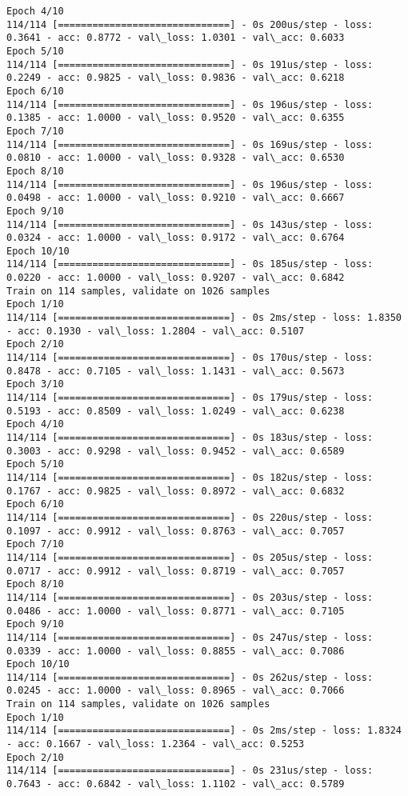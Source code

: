 \documentclass[11pt]{article}
\begin{document}
\begin{Verbatim}[commandchars=\\\{\}]
Epoch 4/10
114/114 [==============================] - 0s 200us/step - loss: 0.3641 - acc: 0.8772 - val\_loss: 1.0301 - val\_acc: 0.6033
Epoch 5/10
114/114 [==============================] - 0s 191us/step - loss: 0.2249 - acc: 0.9825 - val\_loss: 0.9836 - val\_acc: 0.6218
Epoch 6/10
114/114 [==============================] - 0s 196us/step - loss: 0.1385 - acc: 1.0000 - val\_loss: 0.9520 - val\_acc: 0.6355
Epoch 7/10
114/114 [==============================] - 0s 169us/step - loss: 0.0810 - acc: 1.0000 - val\_loss: 0.9328 - val\_acc: 0.6530
Epoch 8/10
114/114 [==============================] - 0s 196us/step - loss: 0.0498 - acc: 1.0000 - val\_loss: 0.9210 - val\_acc: 0.6667
Epoch 9/10
114/114 [==============================] - 0s 143us/step - loss: 0.0324 - acc: 1.0000 - val\_loss: 0.9172 - val\_acc: 0.6764
Epoch 10/10
114/114 [==============================] - 0s 185us/step - loss: 0.0220 - acc: 1.0000 - val\_loss: 0.9207 - val\_acc: 0.6842
Train on 114 samples, validate on 1026 samples
Epoch 1/10
114/114 [==============================] - 0s 2ms/step - loss: 1.8350 - acc: 0.1930 - val\_loss: 1.2804 - val\_acc: 0.5107
Epoch 2/10
114/114 [==============================] - 0s 170us/step - loss: 0.8478 - acc: 0.7105 - val\_loss: 1.1431 - val\_acc: 0.5673
Epoch 3/10
114/114 [==============================] - 0s 179us/step - loss: 0.5193 - acc: 0.8509 - val\_loss: 1.0249 - val\_acc: 0.6238
Epoch 4/10
114/114 [==============================] - 0s 183us/step - loss: 0.3003 - acc: 0.9298 - val\_loss: 0.9452 - val\_acc: 0.6589
Epoch 5/10
114/114 [==============================] - 0s 182us/step - loss: 0.1767 - acc: 0.9825 - val\_loss: 0.8972 - val\_acc: 0.6832
Epoch 6/10
114/114 [==============================] - 0s 220us/step - loss: 0.1097 - acc: 0.9912 - val\_loss: 0.8763 - val\_acc: 0.7057
Epoch 7/10
114/114 [==============================] - 0s 205us/step - loss: 0.0717 - acc: 0.9912 - val\_loss: 0.8719 - val\_acc: 0.7057
Epoch 8/10
114/114 [==============================] - 0s 203us/step - loss: 0.0486 - acc: 1.0000 - val\_loss: 0.8771 - val\_acc: 0.7105
Epoch 9/10
114/114 [==============================] - 0s 247us/step - loss: 0.0339 - acc: 1.0000 - val\_loss: 0.8855 - val\_acc: 0.7086
Epoch 10/10
114/114 [==============================] - 0s 262us/step - loss: 0.0245 - acc: 1.0000 - val\_loss: 0.8965 - val\_acc: 0.7066
Train on 114 samples, validate on 1026 samples
Epoch 1/10
114/114 [==============================] - 0s 2ms/step - loss: 1.8324 - acc: 0.1667 - val\_loss: 1.2364 - val\_acc: 0.5253
Epoch 2/10
114/114 [==============================] - 0s 231us/step - loss: 0.7643 - acc: 0.6842 - val\_loss: 1.1102 - val\_acc: 0.5789

\end{Verbatim}
\end{document}
